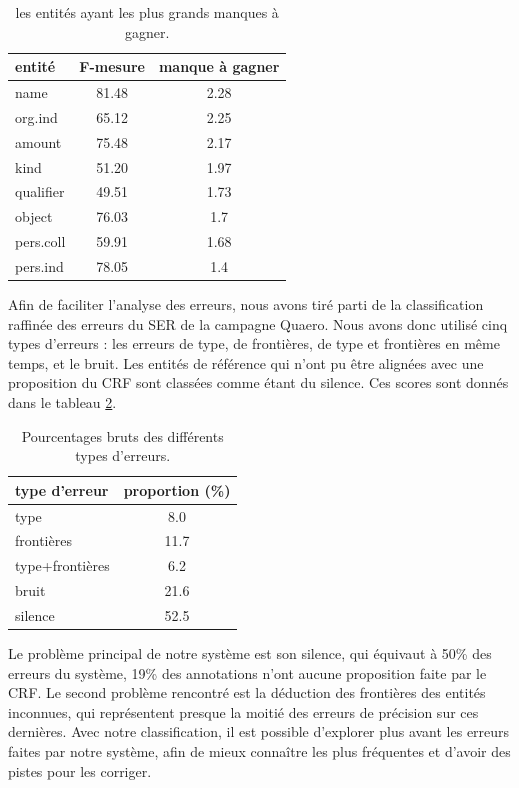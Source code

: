 \documentclass[12pt,a4paper,times,twoside,openright]{report}
\begin{document}
\begin{table}[ht!]
    \centering
    \begin{tabular}{|l|c|c|}
    \hline
    entité    & F-mesure & manque à gagner \\
    \hline
    name      & 81.48 & 2.28 \\
    org.ind   & 65.12 & 2.25 \\
    amount    & 75.48 & 2.17 \\
    kind      & 51.20 & 1.97 \\
    qualifier & 49.51 & 1.73 \\
    object    & 76.03 & 1.7  \\
    pers.coll & 59.91 & 1.68 \\
    pers.ind  & 78.05 & 1.4  \\
    \hline
    \end{tabular}
\caption{les entités ayant les plus grands manques à gagner.}
\label{tab:fscore-shortfalls}
\end{table}

Afin de faciliter l'analyse des erreurs, nous avons tiré parti de la classification raffinée des erreurs du SER de la campagne Quaero. Nous avons donc utilisé cinq types d'erreurs : les erreurs de type, de frontières, de type et frontières en même temps, et le bruit. Les entités de référence qui n'ont pu être alignées avec une proposition du CRF sont classées comme étant du silence. Ces scores sont donnés dans le tableau \ref{tab:error-types}. %

\begin{table}[ht!]
\centering
\begin{tabular}{|l|c|}
\hline
type d'erreur      & proportion (\%) \\
\hline
type & 8.0 \\
frontières & 11.7 \\
type+frontières    & 6.2 \\
bruit & 21.6 \\
silence & 52.5 \\
\hline
\end{tabular}
\caption{Pourcentages bruts des différents types d'erreurs.}
\label{tab:error-types}
\end{table}

Le problème principal de notre système est son silence, qui équivaut à 50\% des erreurs du système, 19\% des annotations n'ont aucune proposition faite par le CRF. Le second problème rencontré est la déduction des frontières des entités inconnues, qui représentent presque la moitié des erreurs de précision sur ces dernières. Avec notre classification, il est possible d'explorer plus avant les erreurs faites par notre système, afin de mieux connaître les plus fréquentes et d'avoir des pistes pour les corriger.
\end{document}
